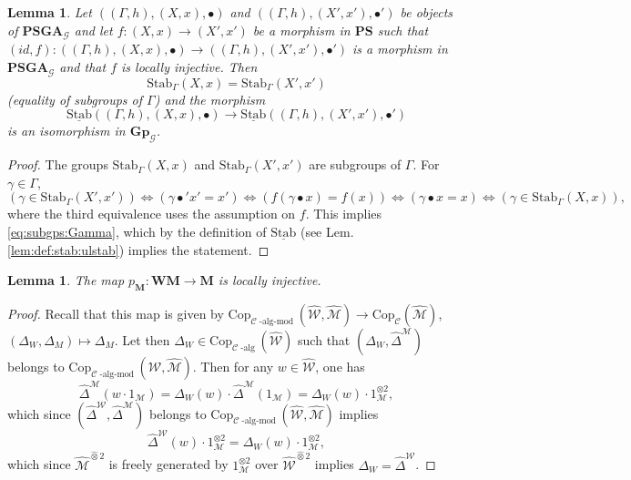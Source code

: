 \documentclass[10pt]{amsart}
\newtheorem{lem}[thm]{Lemma}
\numberwithin{equation}{subsection}
\begin{document}
\begin{lem}\label{lem:3010:1129}
    Let $((\Gamma,h),(X,x),\bullet)$ and $((\Gamma,h),(X',x'),\bullet')$
     be objects of $\mathbf{PSGA}_{\mathcal G}$ and let $f : (X,x)\to(X',x')$ be a morphism in 
     $\mathbf{PS}$ such that $(id,f) : ((\Gamma,h),(X,x),\bullet)\to ((\Gamma,h),(X',x'),\bullet')$ is a 
     morphism in $\mathbf{PSGA}_{\mathcal G}$ and that $f$ is locally injective. Then 
     \begin{equation}\label{eq:subgps:Gamma}
      \mathrm{Stab}_\Gamma(X,x)=\mathrm{Stab}_\Gamma(X',x')   
     \end{equation}
   (equality of subgroups of $\Gamma$) and the morphism 
     $$ \underline{\mathrm{Stab}}((\Gamma,h),(X,x),\bullet)\to\underline{\mathrm{Stab}}((\Gamma,h),(X',x'),\bullet')$$  
     is an isomorphism in $\mathbf{Gp}_{\mathcal G}$. 
\end{lem}

\begin{proof}
The groups $\mathrm{Stab}_\Gamma(X,x)$ and $\mathrm{Stab}_\Gamma(X',x')$ are subgroups of $\Gamma$. 
For $\gamma\in\Gamma$, 
$$
(\gamma\in\mathrm{Stab}_\Gamma(X',x'))\iff(\gamma\bullet'x'=x')\iff(f(\gamma\bullet x)=f(x))
\iff (\gamma\bullet x=x)\iff(\gamma\in\mathrm{Stab}_\Gamma(X,x)),
$$ 
where the third equivalence uses the assumption on $f$. This implies \eqref{eq:subgps:Gamma}, 
which by the definition of $\underline{\mathrm{Stab}}$ (see Lem. \ref{lem:def:stab:ulstab}) implies the statement. 
\end{proof}

\begin{lem}\label{lem:3010:1129a}
    The map $p_{\mathbf M} : \mathbf{WM}\to\mathbf M$ is locally injective. 
\end{lem}

\begin{proof}
Recall that this map is given by $\mathrm{Cop}_{\mathcal C\operatorname{-alg-mod}}
(\hat{\mathcal W},\hat{\mathcal M})\to \mathrm{Cop}_{\mathcal C}(\hat{\mathcal M})$,  
$(\Delta_W,\Delta_M)\mapsto \Delta_M$. Let then $\Delta_W\in\mathrm{Cop}_{\mathcal C\operatorname{-alg}}(\hat{\mathcal W})$
such that $(\Delta_W,\hat\Delta^{\mathcal M})$ belongs to $\mathrm{Cop}_{\mathcal C\operatorname{-alg-mod}}
(\hat{\mathcal W},\hat{\mathcal M})$. Then for any $w\in\hat{\mathcal W}$, one has
$$
\hat\Delta^{\mathcal M}(w\cdot 1_{\mathcal M})=\Delta_W(w)\cdot \hat\Delta^{\mathcal M}(1_{\mathcal M})
=\Delta_W(w)\cdot 1_{\mathcal M}^{\otimes2},  
$$
which since $(\hat\Delta^{\mathcal W},\hat\Delta^{\mathcal M})$ belongs to $\mathrm{Cop}_{\mathcal C\operatorname{-alg-mod}}
(\hat{\mathcal W},\hat{\mathcal M})$ implies
$$
\hat\Delta^{\mathcal W}(w)\cdot 1_{\mathcal M}^{\otimes2}=\Delta_W(w)\cdot 1_{\mathcal M}^{\otimes2},
$$
which since $\hat{\mathcal M}^{\hat\otimes2}$ is freely generated by $1_{\mathcal M}^{\otimes2}$ over $\hat{\mathcal W}^{\hat\otimes2}$
implies $\Delta_W=\hat\Delta^{\mathcal W}$. 
\end{proof}
\end{document}
